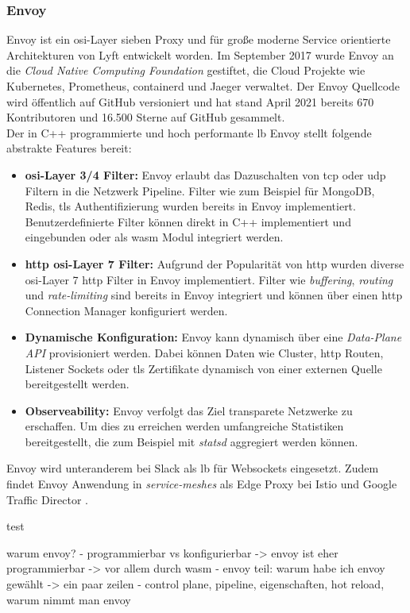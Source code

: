 \subsubsection{Envoy} \label{s:envoy}
Envoy ist ein \ac{osi}-Layer sieben Proxy und für gro{\ss}e moderne Service orientierte Architekturen von Lyft entwickelt worden.
Im September 2017 wurde Envoy an die \textit{Cloud Native Computing Foundation} gestiftet, die Cloud Projekte wie Kubernetes, Prometheus, containerd und Jaeger verwaltet.
Der Envoy Quellcode wird öffentlich auf GitHub versioniert und hat stand April 2021 bereits 670 Kontributoren und 16.500 Sterne auf GitHub gesammelt. \cite{EnvoyproxyEnvoy2021}
\\
Der in C++ programmierte und hoch performante \ac{lb} Envoy stellt folgende abstrakte Features bereit:
\begin{itemize}
    \item \textbf{\acs{osi}-Layer 3/4 Filter:} Envoy erlaubt das Dazuschalten von \acs{tcp} oder \acs{udp} Filtern in die Netzwerk Pipeline. Filter wie zum Beispiel für MongoDB, Redis, \ac{tls} Authentifizierung wurden bereits in Envoy implementiert. Benutzerdefinierte Filter können direkt in C++ implementiert und eingebunden oder als \ac{wasm} Modul integriert werden.
    \item \textbf{\acs{http} \ac{osi}-Layer 7 Filter:} Aufgrund der Popularität von \ac{http} wurden diverse \ac{osi}-Layer 7 \ac{http} Filter in Envoy implementiert. Filter wie \textit{buffering}, \textit{routing} und \textit{rate-limiting} sind bereits in Envoy integriert und können über einen \ac{http} Connection Manager konfiguriert werden.
    \item \textbf{Dynamische Konfiguration:} Envoy kann dynamisch über eine \textit{Data-Plane API} provisioniert werden. Dabei können Daten wie Cluster, \ac{http} Routen, Listener Sockets oder \ac{tls} Zertifikate dynamisch von einer externen Quelle bereitgestellt werden.
    \item \textbf{Observeability:} Envoy verfolgt das Ziel transparete Netzwerke zu erschaffen. Um dies zu erreichen werden umfangreiche Statistiken bereitgestellt, die zum Beispiel mit \textit{statsd} aggregiert werden können.
\end{itemize}
\cite{WhatEnvoyEnvoy}
Envoy wird unteranderem bei Slack \cite{MigratingMillionsConcurrent2021} als \acl{lb} für Websockets eingesetzt. Zudem findet Envoy Anwendung in \textit{service-meshes} als Edge Proxy bei Istio \cite{Istio} und Google Traffic Director \cite{TrafficDirectorGoogle}.

test
\cite{datawireEnvoyInternalsDeep2018}

warum envoy?
- programmierbar vs konfigurierbar -> envoy ist eher programmierbar -> vor allem durch wasm
- envoy teil: warum habe ich envoy gewählt -> ein paar zeilen
  - control plane, pipeline, eigenschaften, hot reload, warum nimmt man envoy
\newpage
